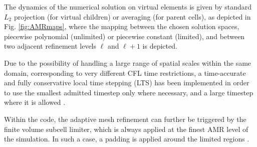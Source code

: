 The dynamics of the numerical solution on virtual elements is given by
standard $L_2$ projection (for virtual children) or averaging (for parent
cells), as depicted in Fig. \ref{fig:AMRmaps}, where the mapping between
the chosen solution spaces, piecewise polynomial (unlimited) or
piecewise constant (limited), and between two adjacent refinement levels
$\ell$ and $\ell+1$ is depicted.

Due to the possibility of handling a large range of spatial
scales within the same domain, corresponding to very different CFL time
restrictions, a time-accurate and fully conservative {local time
  stepping} (LTS) has been implemented in order to use the smallest
admitted timestep only where necessary, and a large timestep where it is
allowed \cite{AMR3DCL}.

Within the  code, the adaptive mesh refinement can further
be triggered by the finite volume subcell limiter, which is always applied
at the finest AMR level of the simulation. In such a case, a padding is
applied around the limited regions
\cite{exahype-review,exahype-guidebook}.

%
